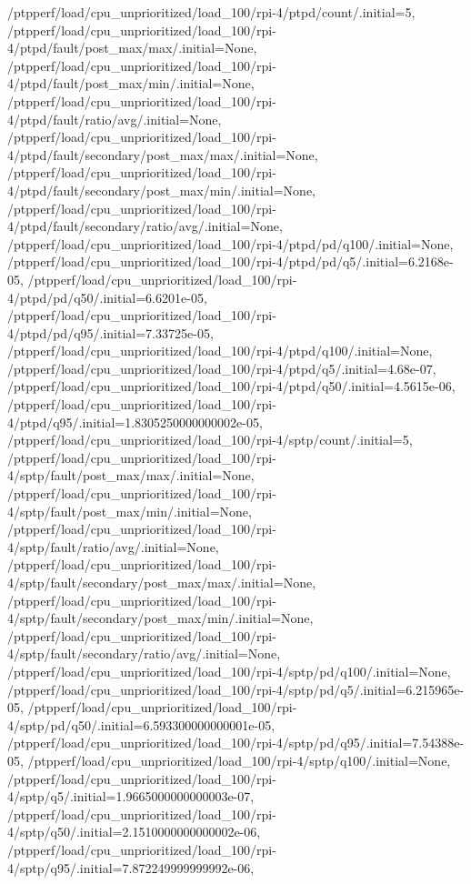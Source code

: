 {    /ptpperf/load/cpu_unprioritized/load_100/rpi-4/ptpd/count/.initial=5,
    /ptpperf/load/cpu_unprioritized/load_100/rpi-4/ptpd/fault/post_max/max/.initial=None,
    /ptpperf/load/cpu_unprioritized/load_100/rpi-4/ptpd/fault/post_max/min/.initial=None,
    /ptpperf/load/cpu_unprioritized/load_100/rpi-4/ptpd/fault/ratio/avg/.initial=None,
    /ptpperf/load/cpu_unprioritized/load_100/rpi-4/ptpd/fault/secondary/post_max/max/.initial=None,
    /ptpperf/load/cpu_unprioritized/load_100/rpi-4/ptpd/fault/secondary/post_max/min/.initial=None,
    /ptpperf/load/cpu_unprioritized/load_100/rpi-4/ptpd/fault/secondary/ratio/avg/.initial=None,
    /ptpperf/load/cpu_unprioritized/load_100/rpi-4/ptpd/pd/q100/.initial=None,
    /ptpperf/load/cpu_unprioritized/load_100/rpi-4/ptpd/pd/q5/.initial=6.2168e-05,
    /ptpperf/load/cpu_unprioritized/load_100/rpi-4/ptpd/pd/q50/.initial=6.6201e-05,
    /ptpperf/load/cpu_unprioritized/load_100/rpi-4/ptpd/pd/q95/.initial=7.33725e-05,
    /ptpperf/load/cpu_unprioritized/load_100/rpi-4/ptpd/q100/.initial=None,
    /ptpperf/load/cpu_unprioritized/load_100/rpi-4/ptpd/q5/.initial=4.68e-07,
    /ptpperf/load/cpu_unprioritized/load_100/rpi-4/ptpd/q50/.initial=4.5615e-06,
    /ptpperf/load/cpu_unprioritized/load_100/rpi-4/ptpd/q95/.initial=1.8305250000000002e-05,
    /ptpperf/load/cpu_unprioritized/load_100/rpi-4/sptp/count/.initial=5,
    /ptpperf/load/cpu_unprioritized/load_100/rpi-4/sptp/fault/post_max/max/.initial=None,
    /ptpperf/load/cpu_unprioritized/load_100/rpi-4/sptp/fault/post_max/min/.initial=None,
    /ptpperf/load/cpu_unprioritized/load_100/rpi-4/sptp/fault/ratio/avg/.initial=None,
    /ptpperf/load/cpu_unprioritized/load_100/rpi-4/sptp/fault/secondary/post_max/max/.initial=None,
    /ptpperf/load/cpu_unprioritized/load_100/rpi-4/sptp/fault/secondary/post_max/min/.initial=None,
    /ptpperf/load/cpu_unprioritized/load_100/rpi-4/sptp/fault/secondary/ratio/avg/.initial=None,
    /ptpperf/load/cpu_unprioritized/load_100/rpi-4/sptp/pd/q100/.initial=None,
    /ptpperf/load/cpu_unprioritized/load_100/rpi-4/sptp/pd/q5/.initial=6.215965e-05,
    /ptpperf/load/cpu_unprioritized/load_100/rpi-4/sptp/pd/q50/.initial=6.593300000000001e-05,
    /ptpperf/load/cpu_unprioritized/load_100/rpi-4/sptp/pd/q95/.initial=7.54388e-05,
    /ptpperf/load/cpu_unprioritized/load_100/rpi-4/sptp/q100/.initial=None,
    /ptpperf/load/cpu_unprioritized/load_100/rpi-4/sptp/q5/.initial=1.9665000000000003e-07,
    /ptpperf/load/cpu_unprioritized/load_100/rpi-4/sptp/q50/.initial=2.1510000000000002e-06,
    /ptpperf/load/cpu_unprioritized/load_100/rpi-4/sptp/q95/.initial=7.872249999999992e-06,
}
